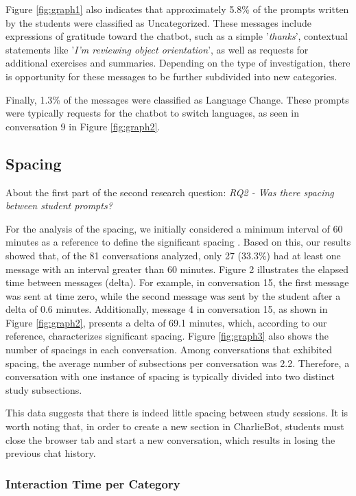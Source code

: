 \documentclass[a4paper,twoside]{article}
\begin{document}
Figure \ref{fig:graph1} also indicates that approximately 5.8\% of the prompts
written by the students were classified as Uncategorized. These messages include
expressions of gratitude toward the chatbot, such as a simple '\textit{thanks}',
contextual statements like '\textit{I'm reviewing object orientation}', as well
as requests for additional exercises and summaries. Depending on the type of
investigation, there is opportunity for these messages to be further subdivided
into new categories.

Finally, 1.3\% of the messages were classified as Language Change. These prompts
were typically requests for the chatbot to switch languages, as seen in
conversation 9 in Figure \ref{fig:graph2}.

\subsection{Spacing}

About the first part of the second research question: \textit{RQ2 - Was there
spacing between student prompts?}

For the analysis of the spacing, we initially considered a minimum interval of
60 minutes as a reference to define the significant spacing \citep{Gadella24}.
Based on this, our results showed that, of the 81 conversations analyzed, only
27 (33.3\%) had at least one message with an interval greater than 60 minutes.
Figure 2 illustrates the elapsed time between messages (delta). For example,
in conversation 15, the first message was sent at time zero, while the second
message was sent by the student after a delta of 0.6 minutes. Additionally,
message 4 in conversation 15, as shown in Figure \ref{fig:graph2}, presents a
delta of 69.1 minutes, which, according to our reference, characterizes
significant spacing. Figure \ref{fig:graph3} also shows the number of spacings
in each conversation. Among conversations that exhibited spacing, the
average number of subsections per conversation was 2.2. Therefore, a
conversation with one instance of spacing is typically divided into two distinct
study subsections.

This data suggests that there is indeed little spacing between study sessions.
It is worth noting that, in order to create a new section in CharlieBot,
students must close the browser tab and start a new conversation, which results
in losing the previous chat history.

\subsubsection{Interaction Time per Category}
\end{document}
